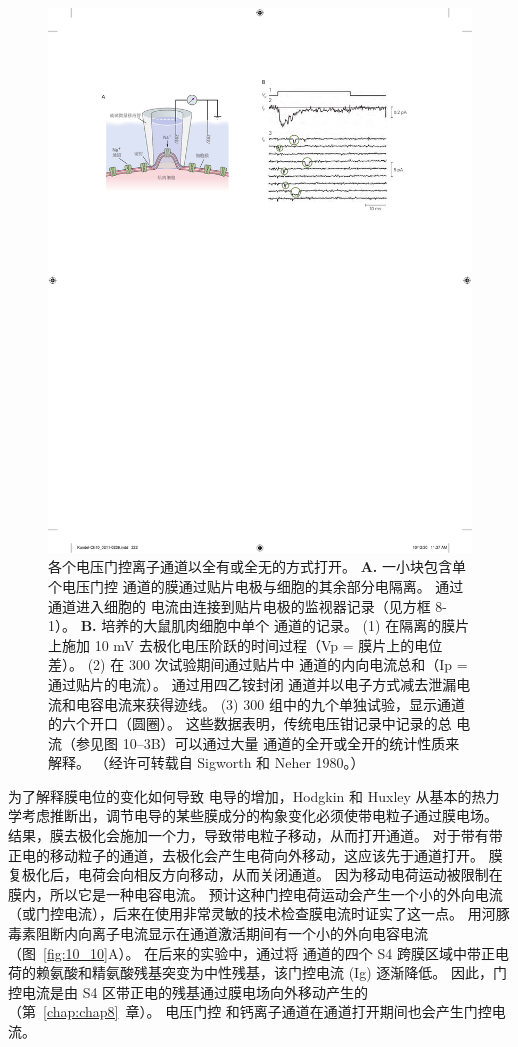 \begin{figure}[htbp]
	\centering
	\includegraphics[width=0.5\linewidth]{chap10/fig_10_9}
	\caption{各个电压门控离子通道以全有或全无的方式打开。
		\textbf{A.} 一小块包含单个电压门控  通道的膜通过贴片电极与细胞的其余部分电隔离。
		通过通道进入细胞的  电流由连接到贴片电极的监视器记录（见方框 8-1）。
		\textbf{B.} 培养的大鼠肌肉细胞中单个  通道的记录。 
		(1) 在隔离的膜片上施加 10 mV 去极化电压阶跃的时间过程（Vp = 膜片上的电位差）。
		(2) 在 300 次试验期间通过贴片中  通道的内向电流总和（Ip = 通过贴片的电流）。
		通过用四乙铵封闭  通道并以电子方式减去泄漏电流和电容电流来获得迹线。
		(3) 300 组中的九个单独试验，显示通道的六个开口（圆圈）。 这些数据表明，传统电压钳记录中记录的总  电流（参见图 10–3B）可以通过大量  通道的全开或全开的统计性质来解释。 （经许可转载自 Sigworth 和 Neher 1980。）}
	\label{fig:10_9}
\end{figure}


为了解释膜电位的变化如何导致  电导的增加，Hodgkin 和 Huxley 从基本的热力学考虑推断出，调节电导的某些膜成分的构象变化必须使带电粒子通过膜电场。 
结果，膜去极化会施加一个力，导致带电粒子移动，从而打开通道。
对于带有带正电的移动粒子的通道，去极化会产生电荷向外移动，这应该先于通道打开。
膜复极化后，电荷会向相反方向移动，从而关闭通道。 
因为移动电荷运动被限制在膜内，所以它是一种电容电流。
预计这种门控电荷运动会产生一个小的外向电流（或门控电流），后来在使用非常灵敏的技术检查膜电流时证实了这一点。
用河豚毒素阻断内向离子电流显示在通道激活期间有一个小的外向电容电流（图~\ref{fig:10_10}A）。 
在后来的实验中，通过将  通道的四个 S4 跨膜区域中带正电荷的赖氨酸和精氨酸残基突变为中性残基，该门控电流 (Ig) 逐渐降低。 
因此，门控电流是由 S4 区带正电的残基通过膜电场向外移动产生的（第~\ref{chap:chap8}~章）。 
电压门控  和钙离子通道在通道打开期间也会产生门控电流。


